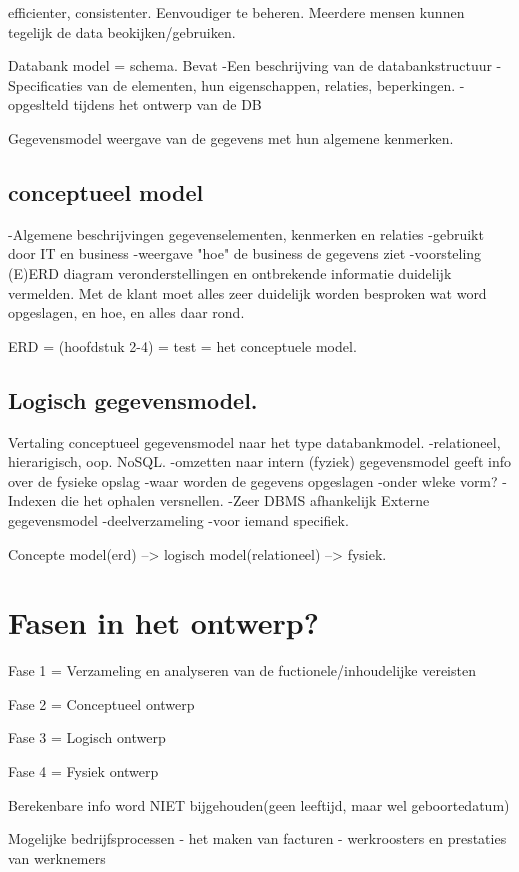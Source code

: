 \documentclass{article}
\begin{document}
efficienter, consistenter. Eenvoudiger te beheren. Meerdere mensen kunnen tegelijk de data beokijken/gebruiken.

Databank model = schema.
Bevat
	-Een beschrijving van de databankstructuur
	- Specificaties van de elementen, hun eigenschappen, relaties, beperkingen.
-opgeslteld tijdens het ontwerp van de DB

Gegevensmodel
	weergave van de gegevens met hun algemene kenmerken.

\subsection{conceptueel model}
-Algemene beschrijvingen gegevenselementen, kenmerken en relaties
	-gebruikt door IT en business
	-weergave "hoe" de business de gegevens ziet
	-voorsteling (E)ERD diagram
veronderstellingen en ontbrekende informatie duidelijk vermelden.
Met de klant moet alles zeer duidelijk worden besproken wat word opgeslagen, en hoe, en alles daar rond.

ERD = (hoofdstuk 2-4) = test = het conceptuele model.

\subsection{Logisch gegevensmodel.}
Vertaling conceptueel gegevensmodel naar het type databankmodel.
	-relationeel, hierarigisch, oop. NoSQL.
-omzetten naar intern (fyziek) gegevensmodel
	geeft info over de fysieke opslag
		-waar worden de gegevens opgeslagen
		-onder wleke vorm?
		-Indexen die het ophalen versnellen.
	-Zeer DBMS afhankelijk
Externe gegevensmodel
	-deelverzameling
	-voor iemand specifiek.

Concepte model(erd) --> logisch model(relationeel) --> fysiek.

\section{Fasen in het ontwerp?}
Fase 1 = Verzameling en analyseren van de fuctionele/inhoudelijke vereisten

Fase 2 = Conceptueel ontwerp

Fase 3 = Logisch ontwerp

Fase 4 = Fysiek ontwerp

Berekenbare info word NIET bijgehouden(geen leeftijd, maar wel geboortedatum)

Mogelijke bedrijfsprocessen
	- het maken van facturen
	- werkroosters en prestaties van werknemers
\end{document}
